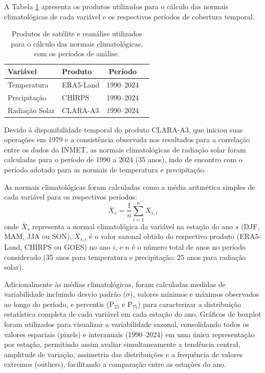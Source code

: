 A Tabela \ref{tab:bases_normais} apresenta os produtos utilizados para o cálculo das 
normais climatológicas de cada variável e os respectivos períodos de cobertura temporal.

\begin{table}[H]
\centering
\caption[Produtos de satélite/reanálise e períodos de análise]{Produtos de satélite e reanálise utilizados para o cálculo das normais climatológicas, com os períodos de análise.}
\label{tab:bases_normais}
\begin{tabular}{llcc}
\hline
\textbf{Variável} & \textbf{Produto} & \textbf{Período}\\
\hline
Temperatura & ERA5-Land & 1990--2024\\
Precipitação & CHIRPS & 1990--2024\\
Radiação Solar & CLARA-A3 & 1990--2024\\
\hline
\end{tabular}
\end{table}

Devido à disponibilidade temporal do produto CLARA-A3, que iniciou suas 
operações em 1979 e a consistência observada nos resultados para a correlação entre os dados do INMET, as normais climatológicas de radiação solar foram calculadas para o período de 1990 a 2024 (35 anos), indo de encontro com o período adotado para as normais de temperatura e precipitação.

As normais climatológicas foram calculadas como a média aritmética simples de cada variável 
para os respectivos períodos:
\begin{equation}
	\bar{X}_s = \frac{1}{n}\sum_{i=1}^{n} X_{s,i}
	\label{eq:normal_climatologica}
\end{equation}
\noindent onde $\bar{X}_s$ representa a normal climatológica da variável na estação do ano 
$s$ (DJF, MAM, JJA ou SON), $X_{s,i}$ é o valor sazonal obtido do respectivo produto 
(ERA5-Land, CHIRPS ou GOES) no ano $i$, e $n$ é o número total de anos no período 
considerado (35 anos para temperatura e precipitação; 25 anos para radiação solar).

Adicionalmente às médias climatológicas, foram calculadas medidas de variabilidade incluindo desvio padrão ($\sigma$), valores mínimos e máximos observados ao longo do período, e percentis (P$_{25}$ e P$_{75}$) para caracterizar a distribuição estatística completa de cada variável em cada estação do ano. Gráficos de boxplot foram utilizados para visualizar a variabilidade sazonal, consolidando todos os valores espaciais (pixels) e interanuais (1990–2024) em uma única representação por estação, permitindo assim avaliar simultaneamente a tendência central, amplitude de variação, assimetria das distribuições e a frequência de valores extremos (outliers), facilitando a comparação entre as estações do ano.

